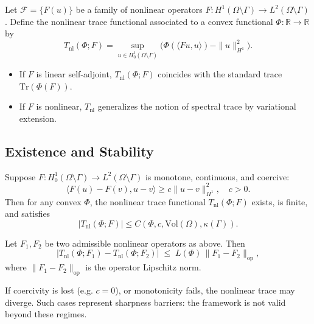 \begin{definition}
\label{def:nonlinear-trace}
Let $\mathcal{F}=\{F(u)\}$ be a family of nonlinear operators $F: H^1(\Omega\setminus\Gamma)\to L^2(\Omega\setminus\Gamma)$. 
Define the nonlinear trace functional associated to a convex functional $\Phi: \mathbb{R}\to\mathbb{R}$ by
\[
T_{\mathrm{nl}}(\Phi;F) 
= \sup_{u\in H^1_0(\Omega\setminus\Gamma)}
\Big( \Phi(\langle Fu,u\rangle) - \|u\|_{H^1}^2 \Big).
\]
\end{definition}

\begin{remark}[Consistency]
\begin{itemize}
  \item If $F$ is linear self-adjoint, $T_{\mathrm{nl}}(\Phi;F)$ coincides with the standard trace $\mathrm{Tr}(\Phi(F))$. 
  \item If $F$ is nonlinear, $T_{\mathrm{nl}}$ generalizes the notion of spectral trace by variational extension. 
\end{itemize}
\end{remark}

\subsection{Existence and Stability}

\begin{theorem}
\label{thm:existence-nonlinear-trace}
Suppose $F: H^1_0(\Omega\setminus\Gamma)\to L^2(\Omega\setminus\Gamma)$ is monotone, continuous, and coercive:
\[
\langle F(u)-F(v), u-v \rangle \geq c\|u-v\|_{H^1}^2, \quad c>0.
\]
Then for any convex $\Phi$, the nonlinear trace functional $T_{\mathrm{nl}}(\Phi;F)$ exists, is finite, and satisfies
\[
|T_{\mathrm{nl}}(\Phi;F)| \leq C(\Phi,c,\mathrm{Vol}(\Omega),\kappa(\Gamma)).
\]
\end{theorem}

\begin{theorem}
\label{thm:stability-nonlinear-trace}
Let $F_1,F_2$ be two admissible nonlinear operators as above. Then
\[
|T_{\mathrm{nl}}(\Phi;F_1) - T_{\mathrm{nl}}(\Phi;F_2)| 
\;\leq\; L(\Phi)\,\|F_1-F_2\|_{\mathrm{op}},
\]
where $\|F_1-F_2\|_{\mathrm{op}}$ is the operator Lipschitz norm. 
\end{theorem}

\begin{remark}
If coercivity is lost (e.g. $c=0$), or monotonicity fails, the nonlinear trace may diverge. 
Such cases represent sharpness barriers: the framework is not valid beyond these regimes. 
\end{remark}

